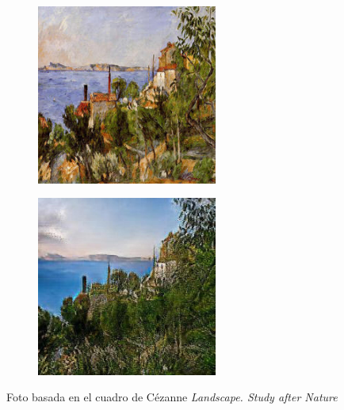 \documentclass[[../main.tex]{subfiles}
\begin{document}
        \begin{figure}[!htb]
            \begin{subfigure}[b]{0.49\textwidth}
            \includegraphics[width=0.65\textwidth]{imagenes/cuadro2imagen/cezanne/00230.jpg}
            \end{subfigure}
        \hfill
            \begin{subfigure}[b]{0.49\textwidth}
            \includegraphics[width=0.65\textwidth]{imagenes/cuadro2imagen/cezanne/00230_2.jpg}
            \end{subfigure}
        \caption{Foto basada en el cuadro de Cézanne \textit{Landscape. Study after Nature}}
        \label{fig:cezanne_foto_landscape}
        \end{figure}
        
\end{document}
